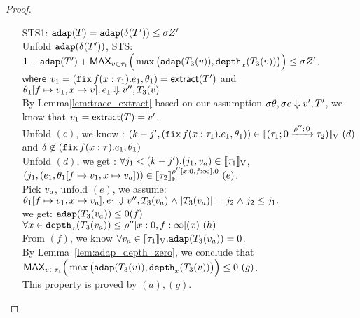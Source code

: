 \documentclass[a4paper,11pt]{article}
\theoremstyle{definition}
\begin{document}
\begin{proof}
\begin{mainitem}
\begin{enumerate}
\item [STS1:] $\adap(\tr) = \adap(\trop(\tr') )  \leq \ienv \nnatA'
  $\\
Unfold $\adap(\trop(\tr') ) $, STS:\\
 $1+ \adap(\tr') + \textsf{MAX}_{\valr \in \tau_1} \Big(
                              \max \big(\adap(\tr_3 (\valr) ),
                              \ddep{x}(\tr_3(\valr)) \big) \Big) \leq
                              \ienv \nnatA' $. \\
      $\mathsf{where}$   $\valr_1 = (\efix f(x: \tau_1). \expr_1, \env_1 ) =
                       \mathsf{extract}(\tr') $ and $  \env_1[f \mapsto
                       \valr_1, x \mapsto \valr], \expr_1 \bigstep
                       \valr'', \tr_3(\valr)  $\\
  By Lemma\ref{lem:trace_extract} based on our assumption $\ienv \env, \ienv \expr \bigstep \valr', \tr'$,  we know that $\valr_1 =
                       \mathsf{extract}(\tr) = v' $.\\
 Unfold $(c)$, we know : $(\stepiA - j',  (\efix f(x: \tau_1). \expr_1, \env_1 ) ) \in \lrv{  (\tarr{ \tau_1}{
      \tau_2 }{0}{\dmap''}{0}) }~(d) $  and $ \delta \not\in  (\efix
  f(x: \tau). \expr_1, \env_1 ) $  \\
  Unfold $(d)$, we get : $ \forall j_1 < (\stepiA-j'). (\stepiB_1,
  \valr_a) \in \lrv{\tau_1} $, $  ( \stepiB_1, ( \expr_1 ,\env_1[f \mapsto
                       \valr_1, x \mapsto \valr_a]) )\in
                       \lre{\dmap''[x:0,f:\infty]}{0}{\tau_2}~(e) $.\\  
   Pick $\valr_a$, unfold $(e)$, we assume:  $ \env_1[f \mapsto
                       \valr_1, x \mapsto \valr_a], \expr_1 \bigstep
                       \valr'', \tr_3(\valr_a)  \conj |\tr_3(\valr_a)|
                       = j_2 \conj j_2 \leq j_1.$
                       \\
   we get: $ \adap(\tr_3(\valr_a)) \leq 0 (f)$ \\
             $ \forall x \in \ddep{x}(\tr_3(\valr_a)) \leq
             \dmap''[x:0,f:\infty](x) ~(h)$ \\

  From $(f)$, we know $\forall \valr_a \in
  \lrv{\tau_1}. \adap(\tr_3(\valr_a)) =0$. \\
 By Lemma~\ref{lem:adap_depth_zero}, we conclude that $ \textsf{MAX}_{\valr \in \tau_1} \Big(
                              \max \big(\adap(\tr_3 (\valr) ),
                              \ddep{x}(\tr_3(\valr)) \big) \Big) \leq 0~(g) $.\\
           This property is proved by $(a),(g)$.


\end{enumerate}
\end{mainitem}
\end{proof}
\end{document}
